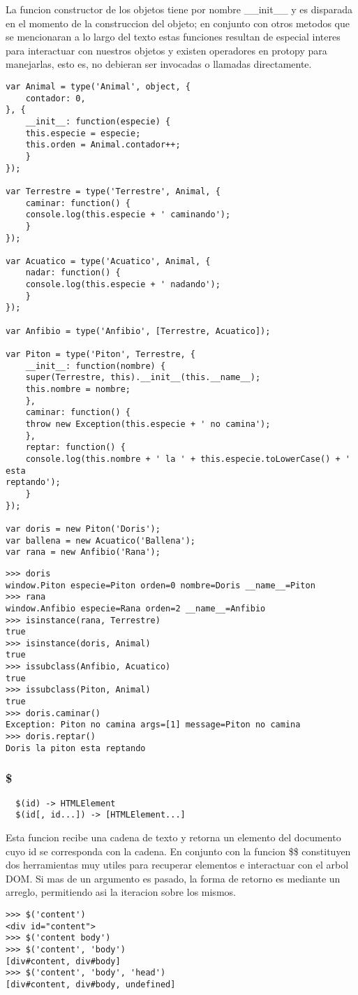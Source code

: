 La funcion constructor de los objetos tiene por nombre __init__ y es disparada
en el momento de la construccion del objeto; en conjunto con otros metodos que
se mencionaran a lo largo del texto estas funciones resultan de especial interes
para interactuar con nuestros objetos y existen operadores en protopy para
manejarlas, esto es, no debieran ser invocadas o llamadas directamente.
\begin{lstlisting}[style=javascript,label=definicion-de-tipos,caption=Definicion
de tipos]
var Animal = type('Animal', object, {
    contador: 0,
}, {
    __init__: function(especie) {
	this.especie = especie;
	this.orden = Animal.contador++;
    }
});

var Terrestre = type('Terrestre', Animal, {
    caminar: function() {
	console.log(this.especie + ' caminando');
    }
});

var Acuatico = type('Acuatico', Animal, {
    nadar: function() {
	console.log(this.especie + ' nadando');
    }
});

var Anfibio = type('Anfibio', [Terrestre, Acuatico]);

var Piton = type('Piton', Terrestre, {
    __init__: function(nombre) {
	super(Terrestre, this).__init__(this.__name__);
	this.nombre = nombre;
    },
    caminar: function() {
	throw new Exception(this.especie + ' no camina');
    },
    reptar: function() {
	console.log(this.nombre + ' la ' + this.especie.toLowerCase() + ' esta
reptando');
    }
});

var doris = new Piton('Doris');
var ballena = new Acuatico('Ballena');
var rana = new Anfibio('Rana');
\end{lstlisting}
\begin{lstlisting}[style=consola]
>>> doris
window.Piton especie=Piton orden=0 nombre=Doris __name__=Piton
>>> rana
window.Anfibio especie=Rana orden=2 __name__=Anfibio
>>> isinstance(rana, Terrestre)
true
>>> isinstance(doris, Animal)
true
>>> issubclass(Anfibio, Acuatico)
true
>>> issubclass(Piton, Animal)
true
>>> doris.caminar()
Exception: Piton no camina args=[1] message=Piton no camina
>>> doris.reptar()
Doris la piton esta reptando
\end{lstlisting}

\subsubsection*{\$}
\begin{verbatim}
  $(id) -> HTMLElement
  $(id[, id...]) -> [HTMLElement...]
\end{verbatim}
Esta funcion recibe una cadena de texto y retorna un elemento del documento cuyo
id se corresponda con la cadena. En conjunto con la funcion \$\$ constituyen dos
herramientas muy utiles para recuperar elementos e interactuar con el arbol DOM.
Si mas de un argumento es pasado, la forma de retorno es mediante un arreglo,
permitiendo asi la iteracion sobre los mismos.
\begin{lstlisting}[style=consola]
>>> $('content')
<div id="content">
>>> $('content body')
>>> $('content', 'body')
[div#content, div#body]
>>> $('content', 'body', 'head')
[div#content, div#body, undefined]
\end{lstlisting}

